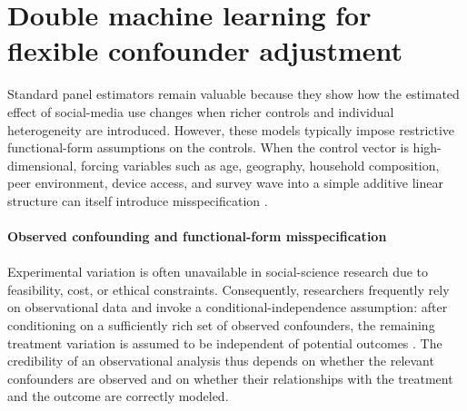 \documentclass[11pt,oneside,a4paper]{book}
\newcommand{\tocsection}[2]{%
  \section[#1]{#2}%
}
\begin{document}
\tocsection{Double Machine Learning for Flexible Confounder Adjustment}{Double machine learning for flexible confounder adjustment}
\label{sec:dml_background}

Standard panel estimators remain valuable because they show how the estimated effect of social-media use changes when richer controls and individual heterogeneity are introduced. However, these models typically impose restrictive functional-form assumptions on the controls. When the control vector is high-dimensional, forcing variables such as age, geography, household composition, peer environment, device access, and survey wave into a simple additive linear structure can itself introduce misspecification \citep{athey2019mlmethods,baiardi2024valueadded,knaus2021musicdml,helal2026returns}.\\
\\
\textbf{Observed confounding and functional-form misspecification}\\
\\
Experimental variation is often unavailable in social-science research due to feasibility, cost, or ethical constraints. Consequently, researchers frequently rely on observational data and invoke a conditional-independence assumption: after conditioning on a sufficiently rich set of observed confounders, the remaining treatment variation is assumed to be independent of potential outcomes \citep{atheyimbens2017state,imbens2004nonparametric,helal2026returns}. The credibility of an observational analysis thus depends on whether the relevant confounders are observed and on whether their relationships with the treatment and the outcome are correctly modeled.
\end{document}
